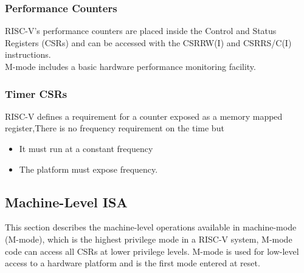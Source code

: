 \documentclass[../main.tex]{subfiles}
\begin{document}
\subsubsection*{ Performance Counters}
RISC-V's performance counters are placed inside the Control and Status Registers (CSRs) and can be accessed with the CSRRW(I) and CSRRS/C(I) instructions.\\
M-mode includes a basic hardware performance monitoring facility. 

\subsubsection*{ Timer CSRs}
RISC-V defines a requirement for a counter exposed as a memory mapped register,There is no frequency requirement on the time but
\begin{itemize}
\item It must run at a constant
frequency
\item The platform must expose
frequency.\\          
\end{itemize} 

\subsection{Machine-Level ISA}
This section describes the machine-level operations available in machine-mode (M-mode), which is the highest privilege mode in a RISC-V system, M-mode code can access all CSRs
at lower privilege levels. M-mode is used for low-level access to a hardware platform and is the first mode entered at reset.\\
\end{document}
